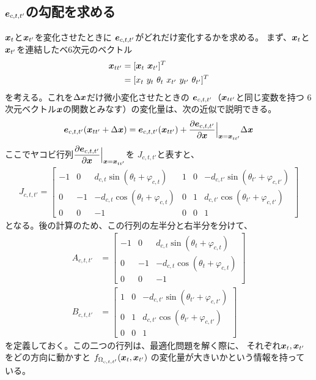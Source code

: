 \subsection{$\boldsymbol{e}_{c,t,t'}$の勾配を求める}

$\boldsymbol{x}_t$と$\boldsymbol{x}_{t'}$を変化させたときに
$\boldsymbol{e}_{c,t,t'}$がどれだけ変化するかを求める。
まず、$\boldsymbol{x}_t$と$\boldsymbol{x}_{t'}$を連結したベ6次元のベクトル
\begin{align}
	\boldsymbol{x}_{tt'} &= [ \boldsymbol{x}_t \ \boldsymbol{x}_{t'} ]^T \nonumber \\
	&= [ x_t \ y_t \ \theta_t \ x_{t'} \ y_{t'} \ \theta_{t'} ]^T \nonumber
\end{align}
を考える。これを$\Delta\boldsymbol{x}$だけ微小変化させたときの
$\boldsymbol{e}_{c,t,t'}$（$\boldsymbol{x}_{tt'}$と同じ変数を持つ
6次元ベクトル$\boldsymbol{x}$の関数とみなす）の変化量は、次の近似で説明できる。
\begin{align}
	\boldsymbol{e}_{c,t,t'}(\boldsymbol{x}_{tt'} + \Delta\boldsymbol{x}) 
	= \boldsymbol{e}_{c,t,t'}(\boldsymbol{x}_{tt'}) 
	+ \dfrac{\partial \boldsymbol{e}_{c,t,t'}}{\partial \boldsymbol{x}} \Big|_{\boldsymbol{x} = \boldsymbol{x}_{tt'}} \Delta\boldsymbol{x}
\end{align}
ここでヤコビ行列$\dfrac{\partial \boldsymbol{e}_{c,t,t'}}{\partial \boldsymbol{x}} \Big|_{\boldsymbol{x} = \boldsymbol{x}_{tt'}}$を
$J_{c,t,t'}$と表すと、
\begin{align}
	J_{c,t,t'} = 
	\begin{bmatrix}
		-1 &  0 & d_{c,t} \sin(\theta_t + \varphi_{c,t}) & 1 & 0 & -d_{c,t'} \sin(\theta_{t'} + \varphi_{c,t'})\\
		 0 & -1 & -d_{c,t} \cos(\theta_t + \varphi_{c,t}) & 0 & 1 & d_{c,t'} \cos(\theta_{t'} + \varphi_{c,t'})\\
		 0 &  0 & -1                                     & 0 & 0 & 1 
	\end{bmatrix}
\end{align}
となる。後の計算のため、この行列の左半分と右半分を分けて、
\begin{align}
	A_{c,t,t'} &= 
	\begin{bmatrix}
		-1 &  0 & d_{c,t} \sin(\theta_t + \varphi_{c,t}) \\
		 0 & -1 & -d_{c,t} \cos(\theta_t + \varphi_{c,t}) \\
		 0 &  0 & -1                                    
	\end{bmatrix} \\
	B_{c,t,t'} &= 
	\begin{bmatrix}
		 1 & 0 & -d_{c,t'} \sin(\theta_{t'} + \varphi_{c,t'})\\
		 0 & 1 & d_{c,t'} \cos(\theta_{t'} + \varphi_{c,t'})\\
		 0 & 0 & 1 
	\end{bmatrix}
\end{align}
を定義しておく。この二つの行列は、最適化問題を解く際に、
それぞれ$\boldsymbol{x}_t, \boldsymbol{x}_{t'}$をどの方向に動かすと
$f_{\Omega_{c,t,t'}}(\boldsymbol{x}_t,\boldsymbol{x}_{t'})$
の変化量が大きいかという情報を持っている。



